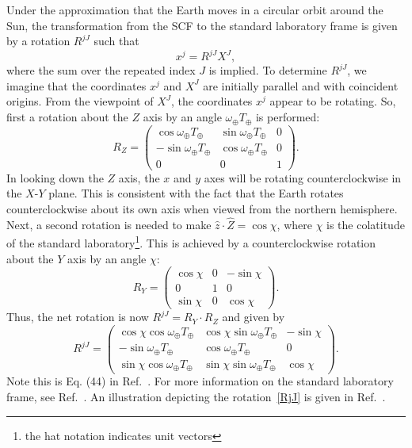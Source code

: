 Under the approximation that the Earth moves in a circular
orbit around the Sun, the transformation from the 
SCF to the standard laboratory frame 
is given by a rotation $R^{jJ}$ such that 
%
\begin{equation}
x^j = R^{jJ}X^J,
\end{equation}
%
where the sum over the repeated index $J$ is implied.
To determine $R^{jJ}$, we imagine that the coordinates $x^j$ and
$X^J$ are initially parallel and with coincident origins. 
From the viewpoint of $X^J$,
the coordinates $x^j$ appear to be rotating.
So, first a rotation about the $Z$
axis by an angle $\omega_\oplus T_\oplus$ is performed:
%
\begin{equation}
R_{Z} = \begin{pmatrix} \cos\omega_\oplus T_\oplus 
& \sin\omega_\oplus T_\oplus & 0 \\ 
-\sin\omega_\oplus T_\oplus 
& \cos\omega_\oplus T_\oplus & 0 \\ 0 & 0 & 1 \end{pmatrix}.
\end{equation}
%
In looking down the $Z$ axis, the $x$ and $y$ axes will be rotating
counterclockwise in the $X$-$Y$ plane. 
This is consistent with the fact that
the Earth rotates counterclockwise about
its own axis when viewed from the northern hemisphere. 
Next, a second rotation is needed 
to make $\widehat{z}\cdot\widehat{Z} = \cos\chi$,
where $\chi$ is the colatitude of the 
standard laboratory\footnote{the hat notation indicates unit vectors}.
This is achieved by a counterclockwise 
rotation about the $Y$ axis by an angle $\chi$:
%
\begin{equation}
R_{Y} = \begin{pmatrix} \cos\chi & 0 & -\sin\chi \\ 
0 & 1 & 0 \\ \sin\chi & 0 & \cos\chi\end{pmatrix}.
\end{equation}
%
Thus, the net rotation is now $R^{jJ} = R_{Y}\cdot R_{Z}$ and given by
%
\begin{equation}
\label{RjJ}
R^{jJ} = \begin{pmatrix} \cos\chi\cos\omega_\oplus T_\oplus & \cos\chi\sin\omega_\oplus T_\oplus 
& -\sin\chi \\ -\sin\omega_\oplus T_\oplus & \cos\omega_\oplus T_\oplus & 0
\\ \sin\chi\cos\omega_\oplus T_\oplus & \sin\chi \sin\omega_\oplus T_\oplus & \cos\chi
\end{pmatrix}.
\end{equation}
%
Note this is Eq. (44) in Ref.~\cite{kd16}.
For more information on the 
standard laboratory frame, see Ref.~\cite{km02}. 
An illustration depicting the rotation~\eqref{RjJ} is 
given in Ref.~\cite{k2000}. 

